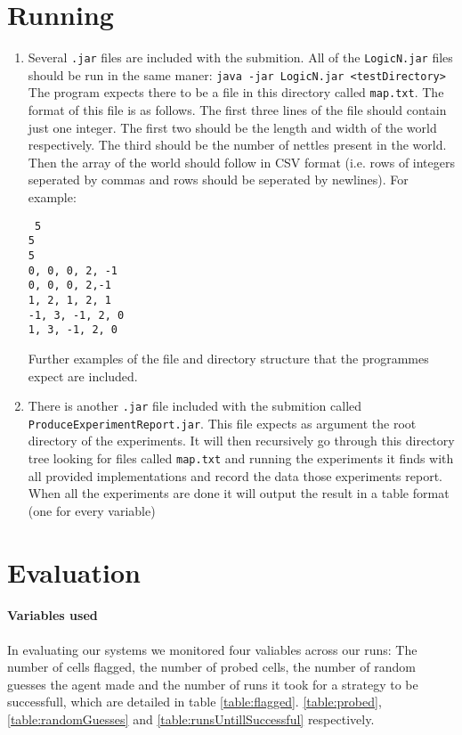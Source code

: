\documentclass[british]{article}
\newcommand{\code}[1]{\texttt{#1}}
\begin{document}
\section{Running}
\label{running}
\begin{enumerate}
\item  Several \code{.jar} files are included with the submition. All of the \code{LogicN.jar} files should be run in the same maner: \code{java -jar LogicN.jar <testDirectory>} The program expects there to be a file in this directory called \code{map.txt}. The format of this file is as follows. The first three lines of the file should contain just one integer. The first two should be the length and width of the world respectively. The third should be the number of nettles present in the world. Then the array of the world should follow in CSV format (i.e. rows of integers seperated by commas and rows should be seperated by newlines). For example: \begin{lstlisting} 5
5
5
0, 0, 0, 2, -1
0, 0, 0, 2,-1
1, 2, 1, 2, 1
-1, 3, -1, 2, 0
1, 3, -1, 2, 0
 \end{lstlisting} Further examples of the file and directory structure that the programmes expect are included.
\item There is another \code{.jar} file included with the submition called \code{ProduceExperimentReport.jar}. This file expects as argument the root directory of the experiments. It will then recursively go through this directory tree looking for files called \code{map.txt}  and running the experiments it finds with all provided implementations and record the data those experiments report. When all the experiments are done it will output the result in a table format (one for every variable)   
\end{enumerate}
 
\section{Evaluation}
\label{evals}
\paragraph{Variables used} In evaluating our systems we monitored four valiables across our runs: The number of cells flagged, the number of probed cells, the number of random guesses the agent made and the number of runs it took for a strategy to be successfull, which are detailed in table \ref{table:flagged}. \ref{table:probed}, \ref{table:randomGuesses} and \ref{table:runsUntillSuccessful} respectively. 
\end{document}
